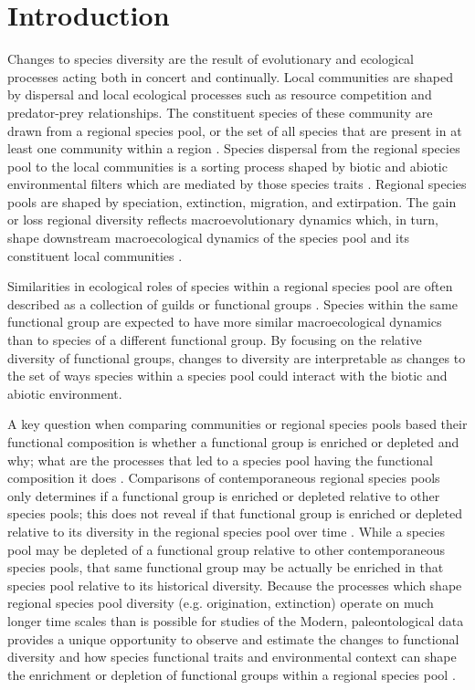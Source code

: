 \documentclass[12pt,letterpaper]{article}
\begin{document}
\section*{Introduction}
Changes to species diversity are the result of evolutionary and ecological processes acting both in concert and continually. Local communities are shaped by dispersal and local ecological processes such as resource competition and predator-prey relationships. The constituent species of these community are drawn from a regional species pool, or the set of all species that are present in at least one community within a region \citep{Mittlebach2015a,Urban2008,Harrison2008}. Species dispersal from the regional species pool to the local communities is a sorting process shaped by biotic and abiotic environmental filters which are mediated by those species traits \citep{Shipley2006,Elith2009,Urban2008,Loeuille2008,Cottenie2005,Harrison2008}. Regional species pools are shaped by speciation, extinction, migration, and extirpation. The gain or loss regional diversity reflects macroevolutionary dynamics which, in turn, shape downstream macroecological dynamics of the species pool and its constituent local communities \citep{Urban2008,Mittlebach2015a,Harrison2008}. 

Similarities in ecological roles of species within a regional species pool are often described as a collection of guilds or functional groups \citep{Valentine1969,Bambach1977,Brown1989,Simberloff1991a,Wilson1999}. Species within the same functional group are expected to have more similar macroecological dynamics than to species of a different functional group. By focusing on the relative diversity of functional groups, changes to diversity are interpretable as changes to the set of ways species within a species pool could interact with the biotic and abiotic environment. 

A key question when comparing communities or regional species pools based their functional composition is whether a functional group is enriched or depleted and why; what are the processes that led to a species pool having the functional composition it does \citep{Mcgill2006,Webber2017,Brown1989,Smith2008b,Blois2009}. Comparisons of contemporaneous regional species pools only determines if a functional group is enriched or depleted relative to other species pools; this does not reveal if that functional group is enriched or depleted relative to its diversity in the regional species pool over time \citep{Blois2009}. While a species pool may be depleted of a functional group relative to other contemporaneous species pools, that same functional group may be actually be enriched in that species pool relative to its historical diversity. Because the processes which shape regional species pool diversity (e.g. origination, extinction) operate on much longer time scales than is possible for studies of the Modern, paleontological data provides a unique opportunity to observe and estimate the changes to functional diversity and how species functional traits and environmental context can shape the enrichment or depletion of functional groups within a regional species pool \citep{Blois2009,Smith2008b}.
\end{document}
